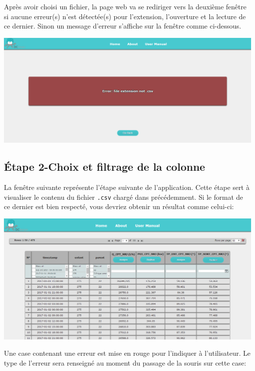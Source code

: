 		Après avoir choisi un fichier, la page web va se rediriger vers la deuxième fenêtre si aucune erreur(s) n'est détectée(s) pour l'extension, l'ouverture et la lecture de ce dernier. Sinon un message d'erreur s'affiche sur la fenêtre comme ci-dessous.\\
		
				
	\begin{center}\includegraphics[scale=0.45]{fenetreErreur.png}\end{center}
			
	\subsection{Étape 2-Choix et filtrage de la colonne}
	
		La fenêtre suivante représente l'étape suivante de l'application. Cette étape sert à visualiser le contenu du fichier \lstinline!.csv! chargé dans précédemment. Si le format de ce dernier est bien respecté, vous devriez obtenir un résultat comme celui-ci:\\
		\begin{center}\includegraphics[scale=0.45]{fenetre2.png}\end{center}
		
		Une case contenant une erreur est mise en rouge pour l'indiquer à l'utilisateur. Le type de l'erreur sera renseigné au moment du passage de la souris sur cette case: \\
		
